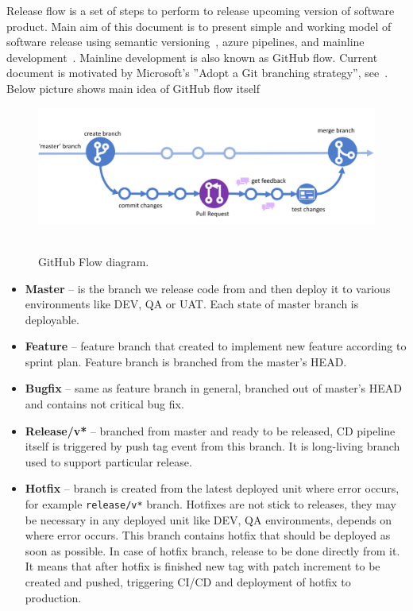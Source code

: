 Release flow is a set of steps to perform to release upcoming version of software product.
Main aim of this document is to present simple and working model of software release
using semantic versioning~\cite{SemanticVersioning}, azure pipelines,
and mainline development~\cite{MainlineDevelopment}.
Mainline development is also known as GitHub flow.
Current document is motivated by Microsoft's ''Adopt a Git branching strategy'', see~\cite{AdoptGitStrategy}.
Below picture shows main idea of GitHub flow itself
\begin{figure}[H]
    \centering
    \includegraphics[width=1\textwidth]{../img/GitHub_Flow}
    ~\caption{GitHub Flow diagram.}
\end{figure}
\begin{itemize}
    \item \textbf{Master} -- is the branch we release code from and then deploy it to various environments like
    DEV, QA or UAT. Each state of master branch is deployable.
    \item \textbf{Feature} -- feature branch that created to implement new feature according to sprint plan.
    Feature branch is branched from the master's HEAD\@.
    \item \textbf{Bugfix} -- same as feature branch in general, branched out of master's HEAD and contains not critical bug fix.
    \item \textbf{Release/v*} -- branched from master and ready to be released, CD pipeline itself is triggered
    by push tag event from this branch.
    It is long-living branch used to support particular release.
    \item \textbf{Hotfix} -- branch is created from the latest deployed unit where error occurs,
    for example \texttt{release/v*} branch.
    Hotfixes are not stick to releases, they may be necessary in any deployed unit like DEV, QA environments,
    depends on where error occurs.
    This branch contains hotfix that should be deployed as soon as possible.
    In case of hotfix branch, release to be done directly from it.
    It means that after hotfix is finished new tag with patch increment to be created and pushed,
    triggering CI/CD and deployment of hotfix to production.
\end{itemize}

